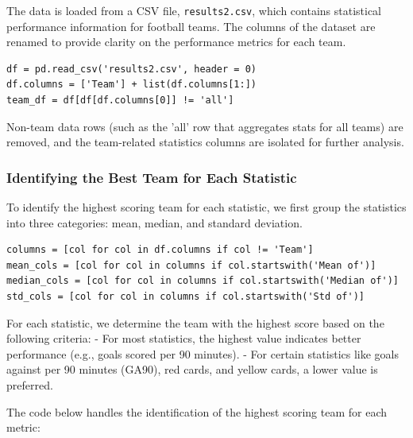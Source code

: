 \documentclass[a4paper,12pt]{article}
\begin{document}
The data is loaded from a CSV file, \texttt{results2.csv}, which contains statistical performance information for football teams. The columns of the dataset are renamed to provide clarity on the performance metrics for each team.

\begin{verbatim}
df = pd.read_csv('results2.csv', header = 0)
df.columns = ['Team'] + list(df.columns[1:])
team_df = df[df[df.columns[0]] != 'all']
\end{verbatim}

Non-team data rows (such as the 'all' row that aggregates stats for all teams) are removed, and the team-related statistics columns are isolated for further analysis.

\subsubsection{Identifying the Best Team for Each Statistic}

To identify the highest scoring team for each statistic, we first group the statistics into three categories: mean, median, and standard deviation.

\begin{verbatim}
columns = [col for col in df.columns if col != 'Team']
mean_cols = [col for col in columns if col.startswith('Mean of')]
median_cols = [col for col in columns if col.startswith('Median of')]
std_cols = [col for col in columns if col.startswith('Std of')]
\end{verbatim}

For each statistic, we determine the team with the highest score based on the following criteria:
- For most statistics, the highest value indicates better performance (e.g., goals scored per 90 minutes).
- For certain statistics like goals against per 90 minutes (GA90), red cards, and yellow cards, a lower value is preferred.

The code below handles the identification of the highest scoring team for each metric:
\end{document}
